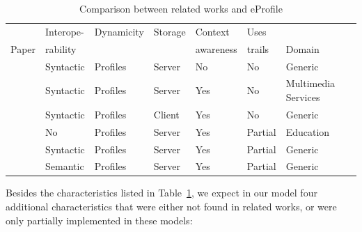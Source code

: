 \documentclass[preprint,authoryear,12pt,dvipdfm]{elsarticle}
\begin{document}
\begin{table}\centering\footnotesize
  \begin{tabular*}{1.16\textwidth}{@{}lllllll@{}}
    \toprule
                                         & Interope-  & Dynamicity   & Storage  & Context       & Uses    &                     \\
    Paper                                & rability   &             &          & awareness     & trails  & Domain              \\
    \midrule
    \citet{kim08}                    & Syntactic   & Profiles       & Server   & No            & No      & Generic             \\
    \citet{chellouche10}             & Syntactic   & Profiles       & Server   & Yes           & No      & Multimedia Services \\
    \citet{niederee04}               & Syntactic   & Profiles       & Client   & Yes           & No      & Generic             \\
    \citet{pelep}                    & No         & Profiles       & Server   & Yes           & Partial & Education           \\
    \citet{razmerita11}              & Syntactic   & Profiles       & Server   & Yes           & Partial & Generic             \\
    \citet{tao11}                    & Semantic   & Profiles       & Server   & Yes           & Partial & Generic             \\
    \bottomrule
  \end{tabular*}
  \caption{Comparison between related works and eProfile}
  \label{tab:comparacao2}
\end{table}

Besides the characteristics listed in Table~\ref{tab:comparacao2}, we expect in our model four additional characteristics that were either not found in related works, or were only partially implemented in these models: 
\end{document}
